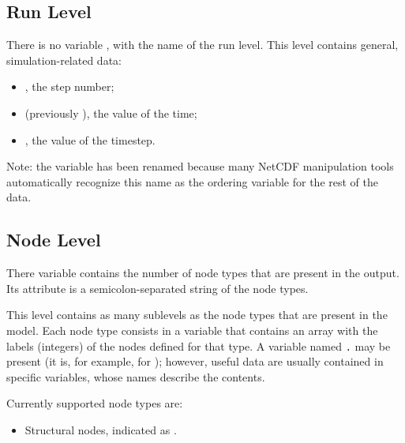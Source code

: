 \subsection{Run Level}
There is no variable , with the name of the run level.
This level contains general, simulation-related data:
\begin{itemize}
\item {}, the step number;
\item {} (previously ), the value of the time;
\item {}, the value of the timestep.
\end{itemize}
Note: the  variable has been renamed 
because many NetCDF manipulation tools automatically recognize
this name as the ordering variable for the rest of the data.



\subsection{Node Level}
There variable  contains the number of node types that are present in the output.
Its attribute  is a semicolon-separated string of the node types.

This level contains as many sublevels as the node types
that are present in the model.
Each node type consists in a variable that contains an array
with the labels (integers) of the nodes defined for that type.
A variable named \texttt{.} may be present
(it is, for example, for ); however, useful data are usually
contained in specific variables, whose names describe the contents.

Currently supported node types are:
\begin{itemize}
\item Structural nodes, indicated as .
\end{itemize}



